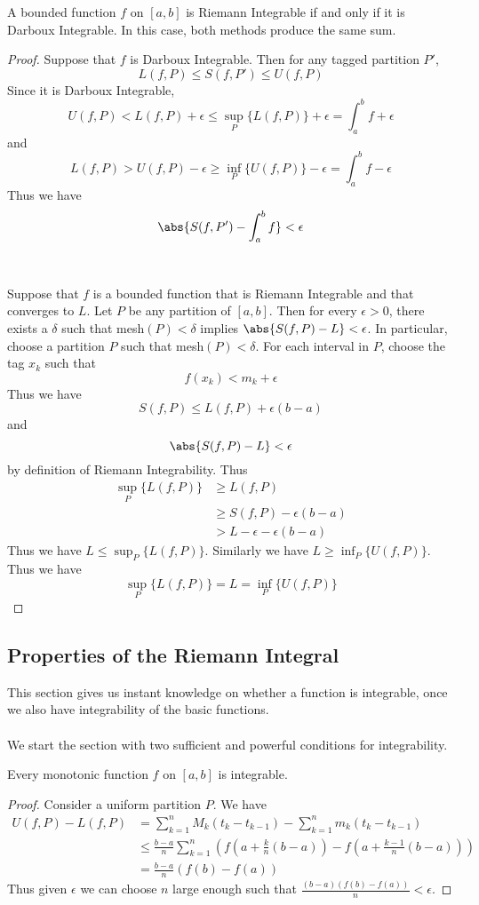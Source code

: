 \begin{thm}{}{} A bounded function $f$ on $[a,b]$ is Riemann Integrable if and only if it is Darboux Integrable. In this case, both methods produce the same sum. \tcbline
\begin{proof} Suppose that $f$ is Darboux Integrable. Then for any tagged partition $P'$, $$L(f,P)\leq S(f,P')\leq U(f,P)$$ Since it is Darboux Integrable, $$U(f,P)<L(f,P)+\epsilon\leq\sup_P\{L(f,P)\}+\epsilon=\int_a^b f+\epsilon$$ and $$L(f,P)>U(f,P)-\epsilon\geq\inf_P\{U(f,P)\}-\epsilon=\int_a^b f-\epsilon$$ Thus we have $$\abs{S(f,P')-\int_a^b f}<\epsilon$$ \\~\\
Suppose that $f$ is a bounded function that is Riemann Integrable and that converges to $L$. Let $P$ be any partition of $[a,b]$. Then for every $\epsilon>0$, there exists a $\delta$ such that mesh$(P)<\delta$ implies $\abs{S(f,P)-L}<\epsilon$. In particular, choose a partition $P$ such that mesh$(P)<\delta$. For each interval in $P$, choose the tag $x_k$ such that $$f(x_k)<m_k+\epsilon$$ Thus we have $$S(f,P)\leq L(f,P)+\epsilon(b-a)$$ and $$\abs{S(f,P)-L}<\epsilon$$ by definition of Riemann Integrability. Thus 
\begin{align*}
\sup_P\{L(f,P)\}&\geq L(f,P)\\
&\geq S(f,P)-\epsilon(b-a)\\
&>L-\epsilon-\epsilon(b-a)
\end{align*}
Thus we have $L\leq\sup_P\{L(f,P)\}$. Similarly we have $L\geq\inf_P\{U(f,P)\}$. Thus we have $$\sup_P\{L(f,P)\}=L=\inf_P\{U(f,P)\}$$
\end{proof}
\end{thm}

\subsection{Properties of the Riemann Integral}
This section gives us instant knowledge on whether a function is integrable, once we also have integrability of the basic functions. \\~\\
We start the section with two sufficient and powerful conditions for integrability. 
\begin{thm}{}{} Every monotonic function $f$ on $[a,b]$ is integrable. \tcbline
\begin{proof} Consider a uniform partition $P$. We have 
\begin{align*}
U(f,P)-L(f,P)&=\sum_{k=1}^nM_k(t_k-t_{k-1})-\sum_{k=1}^nm_k(t_k-t_{k-1})\\
&\leq\frac{b-a}{n}\sum_{k=1}^n\left(f\left(a+\frac{k}{n}(b-a)\right)-f\left(a+\frac{k-1}{n}(b-a)\right)\right)\\
&=\frac{b-a}{n}(f(b)-f(a))
\end{align*}
Thus given $\epsilon$ we can choose $n$ large enough such that $\frac{(b-a)(f(b)-f(a))}{n}<\epsilon$. 
\end{proof}
\end{thm}

